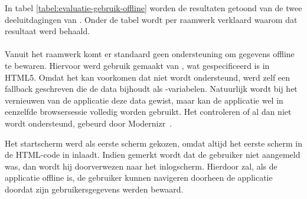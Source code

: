 In tabel \ref{tabel:evaluatie-gebruik-offline} worden de resultaten getoond van de twee deeluitdagingen van .
Onder de tabel wordt per raamwerk verklaard waarom dat resultaat werd behaald.

\begin{table}[H]
\centering
{}
\caption{Gebruik van  voor \st{}~(\sta), \kendo{}~(\kendoa), \jqm{}~(\jqma) en \lungo{}~(\lungoa).}
\label{tabel:evaluatie-gebruik-offline}
\end{table}

\paragraph{\jqm}
Vanuit het raamwerk komt er standaard geen ondersteuning om gegevens offline te bewaren.
Hiervoor werd gebruik gemaakt van , wat gespecificeerd is in HTML5.
Omdat het kan voorkomen dat  niet wordt ondersteund, werd zelf een fallback geschreven die de data bijhoudt als \js{}-variabelen.
Natuurlijk wordt bij het vernieuwen van de applicatie deze data gewist, maar kan de applicatie wel in eenzelfde browsersessie volledig worden gebruikt.
Het controleren of  al dan niet wordt ondersteund, gebeurd door Modernizr~\cite{Modernizr2012}.


Het startscherm werd als eerste scherm gekozen, omdat \jqm{} altijd het eerste scherm in de HTML-code in inlaadt.
Indien gemerkt wordt dat de gebruiker niet aangemeld was, dan wordt hij doorverwezen naar het inlogscherm.
Hierdoor zal, als de applicatie offline is, de gebruiker kunnen navigeren doorheen de applicatie doordat zijn gebruikersgegevens werden bewaard.

